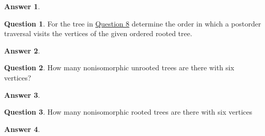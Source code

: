 \documentclass[article, 12pt]{article}
\theoremstyle{definition}
\newtheorem{question}{Question}
\newtheorem{answer}{Answer}
\begin{document}
    \begin{answer}
        \label{a9}
    \end{answer}

    \begin{question}
        \label{q10}
        For the tree in \hyperref[a8]{Question 8} determine the order in which a postorder traversal visits the vertices of the given ordered rooted tree.
    \end{question}

    \begin{answer}
        \label{a10}
    \end{answer}

    \begin{question}
        \label{q11}
        How many nonisomorphic unrooted trees are there with six vertices?
    \end{question}

    \begin{answer}
        \label{a11}
    \end{answer}

    \begin{question}
        \label{q12}
        How many nonisomorphic rooted trees are there with six vertices    
    \end{question}

    \begin{answer}
        \label{a12}
    \end{answer}
\end{document}
